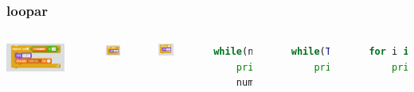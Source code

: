 \documentclass{beamer}
\begin{document}
\begin{frame}[fragile]
	\frametitle{loopar}

	\begin{columns}[c] %
    	\begin{center}
     		\includegraphics[width=0.7\textwidth]{blocks/while_loop.png}
     	\end{center}
     	\begin{center}
     	     \includegraphics[width=0.4\textwidth]{blocks/While_true.png}
     	\end{center}
     	\begin{center}
     	     \includegraphics[width=0.4\textwidth]{blocks/for_loop.png}
     	\end{center}

		\begin{lstlisting}[language=Python]
while(number < 10):
	print("Hello!")
	number += 1
		\end{lstlisting}
		\
		
		\begin{lstlisting}[language=Python]
while(True):
   	print("Hello!")
		\end{lstlisting}
		\
		
		\begin{lstlisting}[language=Python]
for i in range(10):
    print("Hello!")
		\end{lstlisting}
    \end{columns}
\end{frame}
\end{document}
